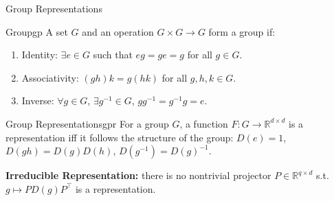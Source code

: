 \documentclass[pdf,serif]{beamer}
\begin{document}
\begin{frame}{Group Representations}
    \begin{defi}{Group}{gp}
        A set $G$ and an operation $G \times G \to G$ form a group if:
        \begin{enumerate}
            \item Identity: $\exists e \in G$ such that $eg = ge = g$ for all $g \in G$.
            \item Associativity: $(gh)k = g(hk)$ for all $g, h, k \in G$.
            \item Inverse: $\forall g \in G$, $\exists g^{-1} \in G$, $gg^{-1} = g^{-1}g = e$.
        \end{enumerate}
    \end{defi}

    \begin{defi}{Group Representations}{gpr}
        For a group $G$, a function $F:G\to \mathbb R^{d\times d}$ is a representation iff it follows the structure of the group: $D(e) = {1}$, $D(gh)=D(g)D(h)$, $D(g^{-1}) = D(g)^{-1}$.
        
        \textbf{Irreducible Representation:} there is no nontrivial projector $P\in \mathbb R^{q\times d}$ s.t. $g\mapsto PD(g)P^\top$ is a representation.
    \end{defi}
\end{frame}
\end{document}
